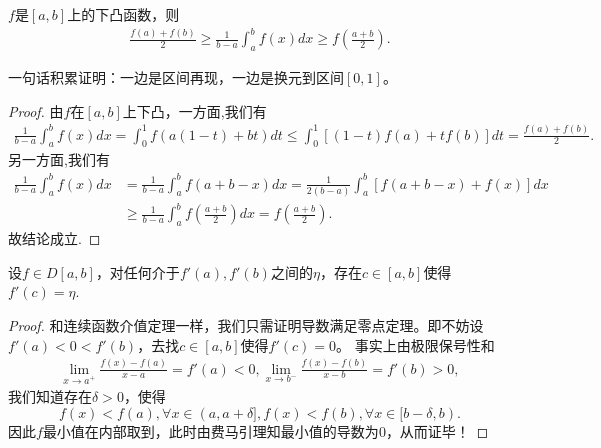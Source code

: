 \documentclass[../../main.tex]{subfiles}
\begin{document}
\begin{theorem}[Hadamard不等式]\label{theorem:Hadamard不等式}
\(f\)是\([a,b]\)上的下凸函数，则
\begin{align*}
\frac{f(a)+f(b)}{2} \geqslant \frac{1}{b - a}\int_{a}^{b}f(x)dx \geqslant f\left(\frac{a + b}{2}\right).
\end{align*} 
\end{theorem}
\begin{note}
一句话积累证明：一边是区间再现，一边是换元到区间\([0,1]\)。
\end{note}
\begin{proof}
由$f$在$[a,b]$上下凸，一方面,我们有
\begin{align*}
\frac{1}{b - a}\int_{a}^{b}f(x)dx = \int_{0}^{1}f(a(1 - t)+bt)dt \leqslant \int_{0}^{1}[(1 - t)f(a)+tf(b)]dt = \frac{f(a)+f(b)}{2}.
\end{align*}
另一方面,我们有
\begin{align*}
\frac{1}{b - a}\int_{a}^{b}f(x)dx &= \frac{1}{b - a}\int_{a}^{b}f(a + b - x)dx
= \frac{1}{2(b - a)}\int_{a}^{b}[f(a + b - x)+f(x)]dx\\
&\geqslant \frac{1}{b - a}\int_{a}^{b}f\left(\frac{a + b}{2}\right)dx
= f\left(\frac{a + b}{2}\right).
\end{align*}
故结论成立.
\end{proof}


\begin{theorem}\label{theorem:导数介值定理}
设\(f \in D[a,b]\)，对任何介于\(f'(a),f'(b)\)之间的\(\eta\)，存在\(c \in [a,b]\)使得\(f'(c)=\eta\).
\end{theorem}
\begin{proof}
和连续函数介值定理一样，我们只需证明导数满足零点定理。即不妨设\(f'(a) < 0 < f'(b)\)，去找\(c \in [a,b]\)使得\(f'(c)=0\)。
事实上由极限保号性和
\begin{align*}
\lim_{x \to a^{+}}\frac{f(x)-f(a)}{x - a}=f'(a)<0,\lim_{x \to b^{-}}\frac{f(x)-f(b)}{x - b}=f'(b)>0,
\end{align*}
我们知道存在\(\delta>0\)，使得
\[f(x)<f(a),\forall x \in (a,a + \delta],f(x)<f(b),\forall x \in [b - \delta,b).\]
因此\(f\)最小值在内部取到，此时由费马引理知最小值的导数为\(0\)，从而证毕！
\end{proof}
\end{document}
